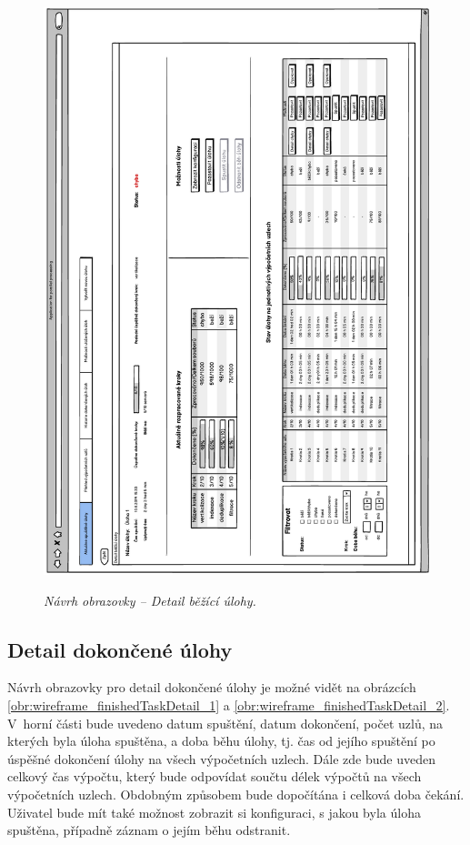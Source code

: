 \begin{figure}[H]
\begin{center}
    \scalebox{0.78}
    {   
        \includegraphics{images/wireframe_taskDetail.pdf}
    }
    \caption{\label{obr:wireframe_taskDetail} {\it Návrh obrazovky -- Detail běžící úlohy.}}
\end{center}
\end{figure}

\subsection*{Detail dokončené úlohy}

Návrh obrazovky pro detail dokončené úlohy je možné vidět na obrázcích \ref{obr:wireframe_finishedTaskDetail_1} a \ref{obr:wireframe_finishedTaskDetail_2}. V~horní části bude uvedeno datum spuštění, datum dokončení, počet uzlů, na kterých byla úloha spuštěna, a doba běhu úlohy, tj. čas od jejího spuštění po úspěšné dokončení úlohy na všech výpočetních uzlech. Dále zde bude uveden celkový čas výpočtu, který bude odpovídat součtu délek výpočtů na všech výpočetních uzlech. Obdobným způsobem bude dopočítána i celková doba čekání. Uživatel bude mít také možnost zobrazit si konfiguraci, s jakou byla úloha spuštěna, případně záznam o jejím běhu odstranit.

